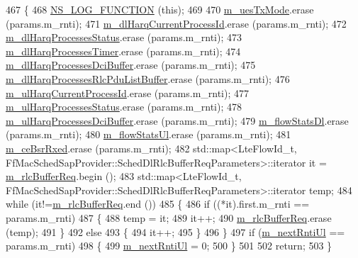 \begin{DoxyCode}
467 \{
468   \hyperlink{log-macros-disabled_8h_a90b90d5bad1f39cb1b64923ea94c0761}{NS\_LOG\_FUNCTION} (\textcolor{keyword}{this});
469   
470   \hyperlink{classns3_1_1TdTbfqFfMacScheduler_a81895414769458c1204040d901d7bba7}{m\_uesTxMode}.erase (params.m\_rnti);
471   \hyperlink{classns3_1_1TdTbfqFfMacScheduler_ad1c507f0824369e326a2f4594a19f5e9}{m\_dlHarqCurrentProcessId}.erase (params.m\_rnti);
472   \hyperlink{classns3_1_1TdTbfqFfMacScheduler_a3d25806fc0b4360d668951f3a6b96b8d}{m\_dlHarqProcessesStatus}.erase  (params.m\_rnti);
473   \hyperlink{classns3_1_1TdTbfqFfMacScheduler_a772806188cbe19e816a9eab534733ee1}{m\_dlHarqProcessesTimer}.erase (params.m\_rnti);
474   \hyperlink{classns3_1_1TdTbfqFfMacScheduler_a50d8986111a3dc24130127d3ea391d7e}{m\_dlHarqProcessesDciBuffer}.erase  (params.m\_rnti);
475   \hyperlink{classns3_1_1TdTbfqFfMacScheduler_a997b6649f2a69dd389d9a4381707b755}{m\_dlHarqProcessesRlcPduListBuffer}.erase  (params.m\_rnti);
476   \hyperlink{classns3_1_1TdTbfqFfMacScheduler_a418d37c6f77b19886fe25e71c103e8b1}{m\_ulHarqCurrentProcessId}.erase  (params.m\_rnti);
477   \hyperlink{classns3_1_1TdTbfqFfMacScheduler_a845d3e79ce5c38b47c8ac8a7e4cc5b37}{m\_ulHarqProcessesStatus}.erase  (params.m\_rnti);
478   \hyperlink{classns3_1_1TdTbfqFfMacScheduler_aa7b74d7f5898ae380db92cdd1205efae}{m\_ulHarqProcessesDciBuffer}.erase  (params.m\_rnti);
479   \hyperlink{classns3_1_1TdTbfqFfMacScheduler_a077474dfdd0b794b6e274954e049e0c4}{m\_flowStatsDl}.erase  (params.m\_rnti);
480   \hyperlink{classns3_1_1TdTbfqFfMacScheduler_ad4ebe2d2a182a088507ade045b583903}{m\_flowStatsUl}.erase  (params.m\_rnti);
481   \hyperlink{classns3_1_1TdTbfqFfMacScheduler_ab399ba0c15f9cd1688fb044cf915deb7}{m\_ceBsrRxed}.erase (params.m\_rnti);
482   std::map<LteFlowId\_t, FfMacSchedSapProvider::SchedDlRlcBufferReqParameters>::iterator it = 
      \hyperlink{classns3_1_1TdTbfqFfMacScheduler_af1c1db8b8201f905faf17ce03f0369db}{m\_rlcBufferReq}.begin ();
483   std::map<LteFlowId\_t, FfMacSchedSapProvider::SchedDlRlcBufferReqParameters>::iterator temp;
484   \textcolor{keywordflow}{while} (it!=\hyperlink{classns3_1_1TdTbfqFfMacScheduler_af1c1db8b8201f905faf17ce03f0369db}{m\_rlcBufferReq}.end ())
485     \{
486       \textcolor{keywordflow}{if} ((*it).first.m\_rnti == params.m\_rnti)
487         \{
488           temp = it;
489           it++;
490           \hyperlink{classns3_1_1TdTbfqFfMacScheduler_af1c1db8b8201f905faf17ce03f0369db}{m\_rlcBufferReq}.erase (temp);
491         \}
492       \textcolor{keywordflow}{else}
493         \{
494           it++;
495         \}
496     \}
497   \textcolor{keywordflow}{if} (\hyperlink{classns3_1_1TdTbfqFfMacScheduler_a01649b4140890dd7adb19d752be0a6ff}{m\_nextRntiUl} == params.m\_rnti)
498     \{
499       \hyperlink{classns3_1_1TdTbfqFfMacScheduler_a01649b4140890dd7adb19d752be0a6ff}{m\_nextRntiUl} = 0;
500     \}
501 
502   \textcolor{keywordflow}{return};
503 \}
\end{DoxyCode}


